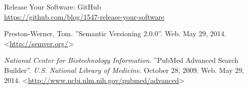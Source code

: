  Release Your Software: GitHub \\
\url{https://github.com/blog/1547-release-your-software}

 Preston-Werner, Tom.  ''Semantic Versioning 2.0.0''. Web.
May 29, 2014. <\url{http://semver.org/}>

 \textit{National Center for Biotechnology
Information}.  ''PubMed Advanced Search Builder''. \textit{U.S. National Library
of Medicine}. October 28, 2009. Web. May 29, 2014. <\url{http://www.ncbi.nlm.nih.gov/pubmed/advanced}>
